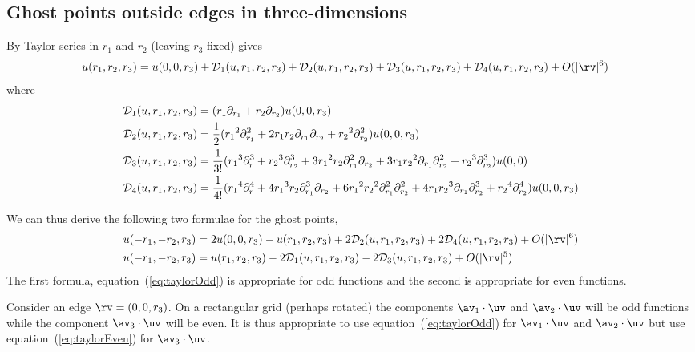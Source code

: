 \documentclass[10pt]{article}
\newcommand{\Ds}{{\mathcal D}}%
\newcommand{\ra}{{r_1}}%
\newcommand{\rb}{{r_2}}%
\newcommand{\rc}{{r_3}}%
\begin{document}
\subsection{Ghost points outside edges in three-dimensions}
By Taylor series in $\ra$ and $\rb$ (leaving $\rc$ fixed) gives
\begin{align*}
  u(\ra,\rb,\rc)&= u(0,0,\rc) + \Ds_1(u,\ra,\rb,\rc) + \Ds_2(u,\ra,\rb,\rc) 
             + \Ds_3(u,\ra,\rb,\rc) + \Ds_4(u,\ra,\rb,\rc) + \trunc
\end{align*}
where
\begin{align*}
  \Ds_1(u,\ra,\rb,\rc) &= (\ra \partial_\ra + \rb \partial_\rb ) u(0,0,\rc) \\
  \Ds_2(u,\ra,\rb,\rc) &= {1\over2}( \ra^2\partial_\ra^2
                            + 2\ra\rb\partial_\ra\partial_\rb +\rb^2\partial_\rb^2 )u(0,0,\rc)  \\
  \Ds_3(u,\ra,\rb,\rc) &= {1\over3!}( \ra^3\partial_r^3 + \rb^3\partial_\rb^3 
                   +3\ra^2\rb\partial_\ra^2\partial_\rb 
                   + 3\ra\rb^2\partial_\ra\partial_\rb^2 
                   + \rb^3\partial_\rb^3  )u(0,0)                    \\
  \Ds_4(u,\ra,\rb,\rc) &= {1\over4!}( \ra^4\partial_r^4
                   +4\ra^3\rb\partial_\ra^3\partial_\rb 
                   +6\ra^2\rb^2\partial_\ra^2\partial_\rb^2 
                   +4\ra\rb^3\partial_\ra\partial_\rb^3 
                   + \rb^4\partial_\rb^4   )u(0,0,\rc)  
\end{align*}

We can thus derive the following two formulae for the ghost points,
\begin{align}
 u(-\ra,-\rb,\rc) &= 2 u(0,0,\rc) - u(\ra,\rb,\rc) + 2\Ds_2(u,\ra,\rb,\rc) 
                         + 2\Ds_4(u,\ra,\rb,\rc)+ \trunc \label{eq:taylorOdd} \\
 u(-\ra,-\rb,\rc) &= u(\ra,\rb,\rc) - 2\Ds_1(u,\ra,\rb,\rc) - 2\Ds_3(u,\ra,\rb,\rc) 
                       + {O(|\rv|^5)} \label{eq:taylorEven}
\end{align}
The first formula, equation~(\ref{eq:taylorOdd}) is appropriate for odd functions and the
second is appropriate for even functions.

Consider an edge $\rv=(0,0,\rc)$. On a rectangular grid (perhaps rotated) the components 
$\av_1\cdot\uv$ and $\av_2\cdot\uv$ will be odd functions while the component
$\av_3\cdot\uv$ will be even. 
It is thus appropriate to use equation~(\ref{eq:taylorOdd}) for $\av_1\cdot\uv$ and $\av_2\cdot\uv$ but
use equation~(\ref{eq:taylorEven}) for $\av_3\cdot\uv$.
\end{document}
